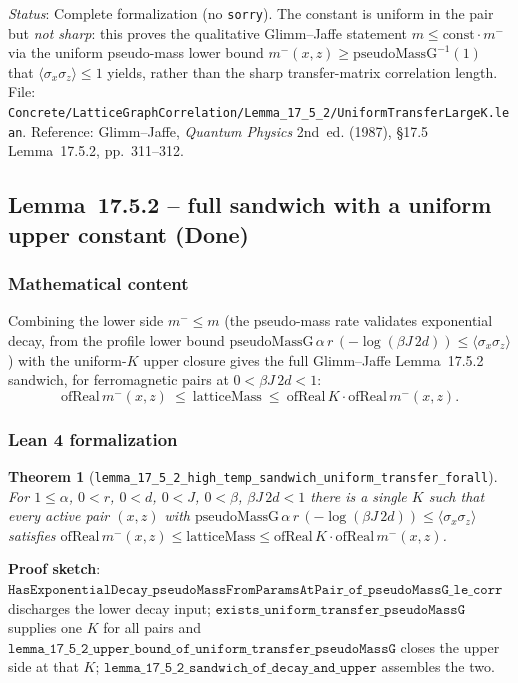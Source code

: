 \documentclass[a4paper,11pt]{article}
\newtheorem{theorem}{Theorem}
\begin{document}
\noindent\textit{Status}: Complete formalization (no \texttt{sorry}).  The constant
is uniform in the pair but \emph{not sharp}: this proves the qualitative
Glimm--Jaffe statement $m\le\mathrm{const}\cdot m^-$ via the uniform pseudo-mass
lower bound $m^-(x,z)\ge\mathrm{pseudoMassG}^{-1}(1)$ that
$\langle\sigma_x\sigma_z\rangle\le 1$ yields, rather than the sharp transfer-matrix
correlation length.
File:
\texttt{Concrete/LatticeGraphCorrelation/Lemma\_17\_5\_2/UniformTransferLargeK.lean}.
Reference: Glimm--Jaffe, \emph{Quantum Physics} 2nd~ed. (1987),
\S17.5 Lemma~17.5.2, pp.~311--312.

\subsection*{Lemma~17.5.2 -- full sandwich with a uniform upper constant (Done)}

\subsubsection*{Mathematical content}

Combining the lower side $m^-\le m$ (the pseudo-mass rate validates exponential
decay, from the profile lower bound
$\mathrm{pseudoMassG}\,\alpha\,r\,(-\log(\beta J\,2d))\le
\langle\sigma_x\sigma_z\rangle$) with the uniform-$K$ upper closure gives the full
Glimm--Jaffe Lemma~17.5.2 sandwich, for ferromagnetic pairs at
$0<\beta J\,2d<1$:
\[
  \mathrm{ofReal}\,m^-(x,z)\ \le\ \mathrm{latticeMass}\ \le\
  \mathrm{ofReal}\,K\cdot\mathrm{ofReal}\,m^-(x,z).
\]

\subsubsection*{Lean 4 formalization}

\begin{theorem}[\texttt{lemma\_17\_5\_2\_high\_temp\_sandwich\_uniform\_transfer\_forall}]
For $1\le\alpha$, $0<r$, $0<d$, $0<J$, $0<\beta$, $\beta J\,2d<1$ there is a single
$K$ such that every active pair $(x,z)$ with
$\mathrm{pseudoMassG}\,\alpha\,r\,(-\log(\beta J\,2d))\le\langle\sigma_x\sigma_z\rangle$
satisfies
$\mathrm{ofReal}\,m^-(x,z)\le\mathrm{latticeMass}\le\mathrm{ofReal}\,K\cdot
\mathrm{ofReal}\,m^-(x,z)$.
\end{theorem}

\noindent\textbf{Proof sketch}:
$\mathtt{HasExponentialDecay\_pseudoMassFromParamsAtPair\_of\_pseudoMassG\_le\_corr}$
discharges the lower decay input; $\mathtt{exists\_uniform\_transfer\_pseudoMassG}$
supplies one $K$ for all pairs and
$\mathtt{lemma\_17\_5\_2\_upper\_bound\_of\_uniform\_transfer\_pseudoMassG}$ closes
the upper side at that $K$; $\mathtt{lemma\_17\_5\_2\_sandwich\_of\_decay\_and\_upper}$
assembles the two.
\end{document}
